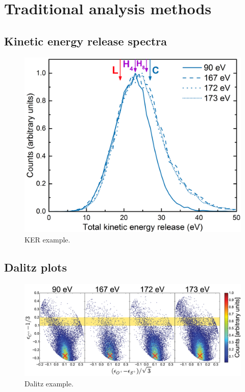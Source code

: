 \section{Traditional analysis methods}

\pagebreak
\subsection{Kinetic energy release spectra}
\begin{figure}
  \centering
  \includegraphics[width=\textwidth]{gfx/KERExample}
  \caption[KER example.]
  {KER example.}
  \label{fig:KERExample}
\end{figure}
\clearpage

\pagebreak
\subsection{Dalitz plots}
\begin{figure}
  \centering
  \includegraphics[width=\textwidth]{gfx/DalitzExample}
  \caption[Dalitz example.]
  {Dalitz example.}
  \label{fig:dalitzExample}
\end{figure}
\clearpage

